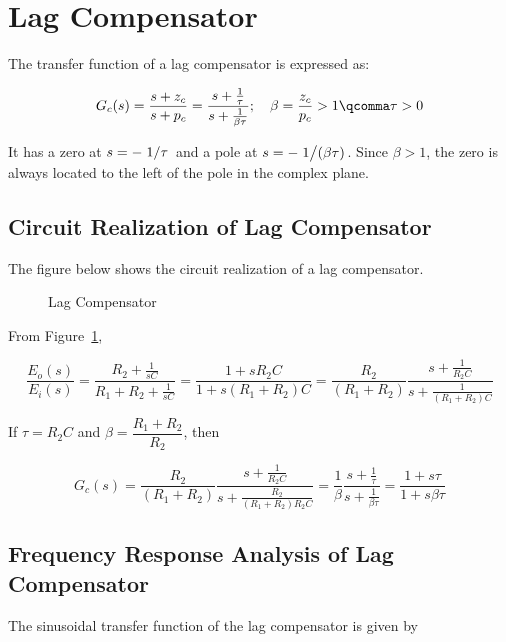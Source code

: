 \documentclass[
  14pt,
  a4paper,
  oneside,
  open=any,
  a4paper,
  14pt]{report}
\begin{document}
\section{Lag Compensator}\label{lag-compensator}

The transfer function of a lag compensator is expressed as:

\[
    G_c(s) = \dfrac{s+z_c}{s+p_c} = \dfrac{s+\frac{1}{\tau}}{s+\frac{1}{\beta\tau}}; \quad \beta = \dfrac{z_c}{p_c} > 1 \qcomma \tau > 0
\]

It has a zero at \(s=-\left.1\middle\slash\tau\right.\) and a pole at
\(s=-\left.1\middle\slash(\beta\tau)\right.\). Since \(\beta > 1\), the zero is
always located to the left of the pole in the complex plane.

\subsection{Circuit Realization of Lag
Compensator}\label{circuit-realization-of-lag-compensator}

The figure below shows the circuit realization of a lag compensator.

\begin{figure}

\centering{



}

\caption{\label{fig-lag-compensator}Lag Compensator}

\end{figure}%

From Figure~\ref{fig-lag-compensator},

\[
    \dfrac{E_o(s)}{E_i(s)} = \dfrac{R_2+\frac{1}{sC}}{R_1+R_2+\frac{1}{sC}} = \dfrac{1+sR_2C}{1+s(R_1+R_2)C} = \dfrac{R_2}{(R_1+R_2)}\dfrac{s+\frac{1}{R_2C}}{s+\frac{1}{(R_1+R_2)C}}
\]

If \(\tau = R_2C\) and \(\beta = \dfrac{R_1+R_2}{R_2}\), then

\[
    G_c(s) = \dfrac{R_2}{(R_1+R_2)}\dfrac{s+\frac{1}{R_2C}}{s+\frac{R_2}{(R_1+R_2)R_2C}} = \dfrac{1}{\beta}\dfrac{s+\frac{1}{\tau}}{s+\frac{1}{\beta\tau}} = \dfrac{1+s\tau}{1+s\beta\tau}
\]

\subsection{Frequency Response Analysis of Lag
Compensator}\label{frequency-response-analysis-of-lag-compensator}

The sinusoidal transfer function of the lag compensator is given by
\end{document}
